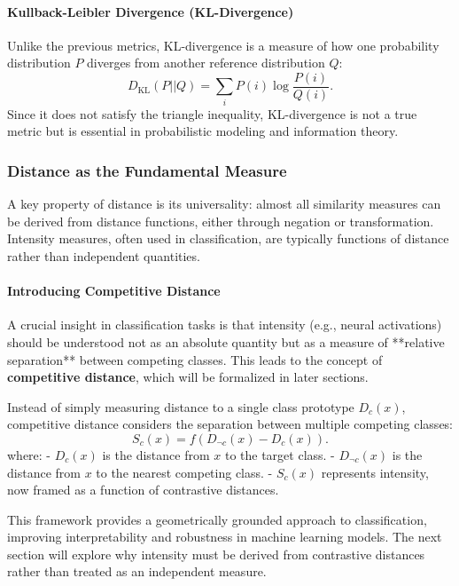 \paragraph{Kullback-Leibler Divergence (KL-Divergence)}
Unlike the previous metrics, KL-divergence is a measure of how one probability distribution \( P \) diverges from another reference distribution \( Q \):
\[
    D_{\text{KL}}(P || Q) = \sum_i P(i) \log \frac{P(i)}{Q(i)}.
\]
Since it does not satisfy the triangle inequality, KL-divergence is not a true metric but is essential in probabilistic modeling and information theory.

\subsubsection{Distance as the Fundamental Measure}

A key property of distance is its universality: almost all similarity measures can be derived from distance functions, either through negation or transformation. Intensity measures, often used in classification, are typically functions of distance rather than independent quantities.

\paragraph{Introducing Competitive Distance}
A crucial insight in classification tasks is that intensity (e.g., neural activations) should be understood not as an absolute quantity but as a measure of **relative separation** between competing classes. This leads to the concept of \textbf{competitive distance}, which will be formalized in later sections.

Instead of simply measuring distance to a single class prototype \( D_c(x) \), competitive distance considers the separation between multiple competing classes:
\[
    S_c(x) = f(D_{\neg c}(x) - D_c(x)).
\]
where:
- \( D_c(x) \) is the distance from \( x \) to the target class.
- \( D_{\neg c}(x) \) is the distance from \( x \) to the nearest competing class.
- \( S_c(x) \) represents intensity, now framed as a function of contrastive distances.


This framework provides a geometrically grounded approach to classification, improving interpretability and robustness in machine learning models. The next section will explore why intensity must be derived from contrastive distances rather than treated as an independent measure.
